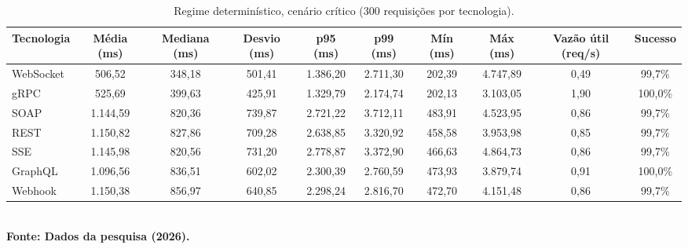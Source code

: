 \begin{table}[H]
\centering
\scriptsize
\caption{Regime determinístico, cenário crítico (300 requisições por tecnologia).}
\label{tab:det_critico}
\begin{tabular}{|l|c|c|c|c|c|c|c|c|c|}
\hline
\textbf{Tecnologia} & \textbf{Média (ms)} & \textbf{Mediana (ms)} & \textbf{Desvio (ms)} & \textbf{p95 (ms)} & \textbf{p99 (ms)} & \textbf{Mín (ms)} & \textbf{Máx (ms)} & \textbf{Vazão útil (req/s)} & \textbf{Sucesso} \\ \hline
WebSocket & 506,52 & 348,18 & 501,41 & 1.386,20 & 2.711,30 & 202,39 & 4.747,89 & 0,49 & 99,7\% \\ \hline
gRPC & 525,69 & 399,63 & 425,91 & 1.329,79 & 2.174,74 & 202,13 & 3.103,05 & 1,90 & 100,0\% \\ \hline
SOAP & 1.144,59 & 820,36 & 739,87 & 2.721,22 & 3.712,11 & 483,91 & 4.523,95 & 0,86 & 99,7\% \\ \hline
REST & 1.150,82 & 827,86 & 709,28 & 2.638,85 & 3.320,92 & 458,58 & 3.953,98 & 0,85 & 99,7\% \\ \hline
SSE & 1.145,98 & 820,56 & 731,20 & 2.778,87 & 3.372,90 & 466,63 & 4.864,73 & 0,86 & 99,7\% \\ \hline
GraphQL & 1.096,56 & 836,51 & 602,02 & 2.300,39 & 2.760,59 & 473,93 & 3.879,74 & 0,91 & 100,0\% \\ \hline
Webhook & 1.150,38 & 856,97 & 640,85 & 2.298,24 & 2.816,70 & 472,70 & 4.151,48 & 0,86 & 99,7\% \\ \hline
\end{tabular}
{\footnotesize\\ \textbf{Fonte: Dados da pesquisa (2026).}}
\end{table}
